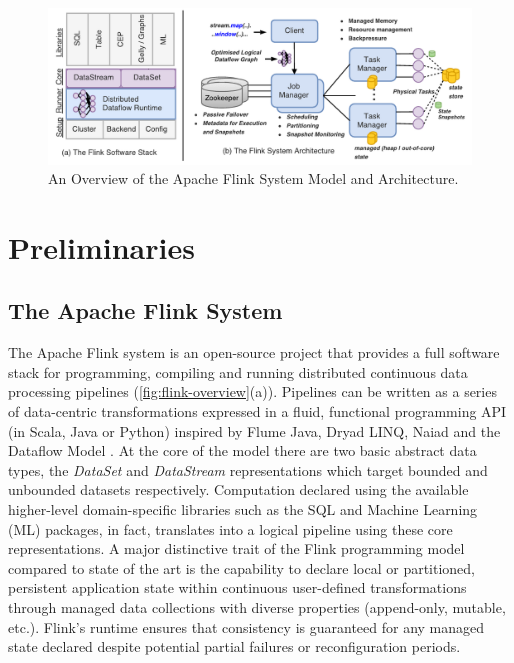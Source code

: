 \begin{figure}[t!]
\centering
\includegraphics[width=\textwidth]{figures/flinkoverview.pdf}
\caption{An Overview of the Apache Flink System Model and Architecture.} 
\label{fig:flink-overview}
\vspace{-4mm}
\end{figure}

\section{Preliminaries}
\label{sec:preliminaries}
\subsection{The Apache Flink System}

The Apache Flink system \cite{CUSTOM:web/Flink} is an open-source project that provides a full software stack for programming, compiling and running distributed continuous data processing pipelines (\autoref{fig:flink-overview}(a)). Pipelines can be written as a series of data-centric transformations expressed in a fluid, functional programming API (in Scala, Java or Python) inspired by Flume Java\cite{chambers2010flumejava}, Dryad LINQ\cite{yu2008dryadlinq}, Naiad\cite{murray2013naiad} and the Dataflow Model \cite{akidau2015dataflow}. At the core of the model there are two basic abstract data types, the \emph{DataSet} and \emph{DataStream} representations which target bounded and unbounded datasets respectively. Computation declared using the available higher-level domain-specific libraries such as the SQL and Machine Learning (ML) packages, in fact, translates into a logical pipeline using these core representations. A major distinctive trait of the Flink programming model compared to state of the art is the capability to declare local or partitioned, persistent application state within continuous user-defined transformations through managed data collections with diverse properties (append-only, mutable, etc.). Flink's runtime ensures that consistency is guaranteed for any managed state declared despite potential partial failures or reconfiguration periods.

